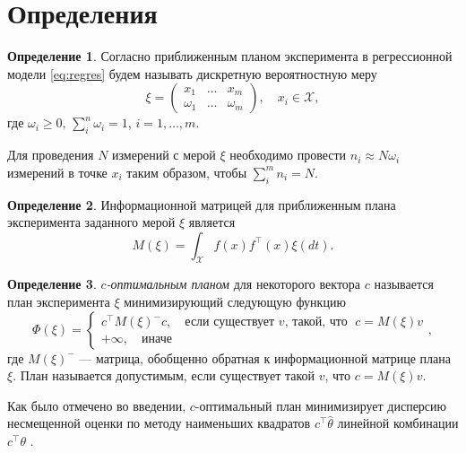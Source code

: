\documentclass[specialist,
               substylefile = spbu.rtx,
               subf,href,colorlinks=true, 12pt]{disser}
\theoremstyle{definition}
\newtheorem{definition}{Определение}
\begin{document}
\section{Определения}

  \begin{definition}
  Согласно \cite{kiefer1974} приближенным планом эксперимента в регрессионной модели \eqref{eq:regres} будем называть дискретную вероятностную меру
  \begin{equation*}
    \xi = 
      \begin{pmatrix}
        x_1 & \ldots & x_m \\
        \omega_1 & \ldots & \omega_m
      \end{pmatrix}, \quad x_i \in \mathcal{X},
  \end{equation*}
   где $\omega_i \geqslant 0, \, \sum_i^n \omega_i = 1$, $i = 1, \ldots, m$.
  \end{definition}

  Для проведения $N$ измерений с мерой $\xi$ необходимо провести $n_i \approx N \omega_i$ измерений в точке $x_i$ таким образом, чтобы $\sum^m_i n_i = N$.

  \begin{definition}
  Информационной матрицей для приближенным плана эксперимента заданного мерой $\xi$ является 
  \begin{equation*}
    M(\xi) = \int_{\mathcal{X}} f(x) f^\top(x) \xi (dt).
  \end{equation*}
  \end{definition}
  
  \begin{definition}
  \label{def:coptim}
  \textit{$c$-оптимальным планом} для некоторого вектора $c$ называется план эксперимента $\xi$ минимизирующий следующую функцию
  \begin{equation}
  \label{eq:cdef}
    \Phi(\xi) = \begin{cases}
      c^\top M(\xi)^{-} c, \quad \text{если существует } v \text{, такой, что } \; c = M(\xi) v\\
      +\infty, \quad  \text{иначе}
    \end{cases},
  \end{equation}
  где $M(\xi)^{-}$ --- матрица, обобщенно обратная к информационной матрице плана $\xi$.
  План называется допустимым, если существует такой $v$, что $c = M(\xi) v$.
  \end{definition}
  
  Как было отмечено во введении, $c$-оптимальный план минимизирует дисперсию несмещенной оценки по методу наименьших квадратов $c^\top \hat{\theta}$ линейной комбинации $c^\top \theta$ \cite{dette1993_2}.
 
\end{document}
